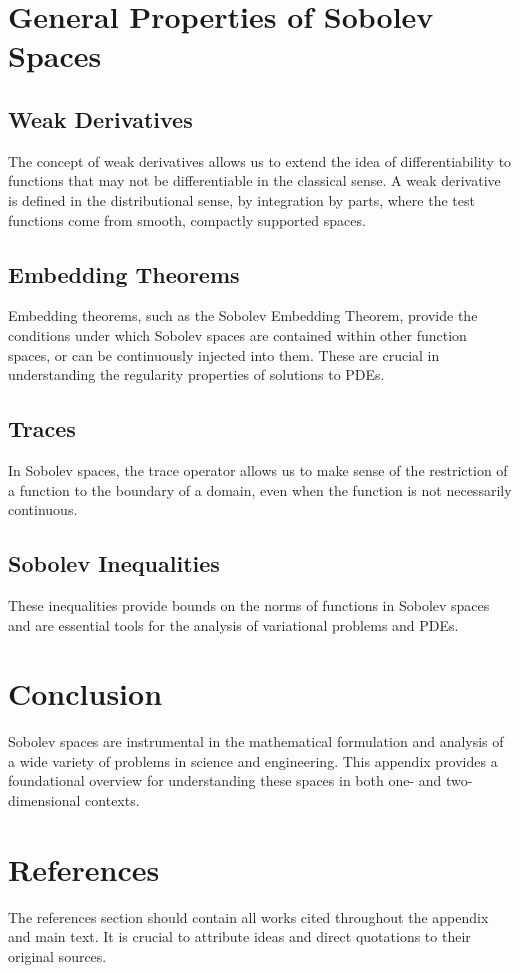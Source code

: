 \documentclass[../../main.tex]{subfiles}
\begin{document}
\section*{General Properties of Sobolev Spaces}
\subsection*{Weak Derivatives}
The concept of weak derivatives allows us to extend the idea of differentiability to functions that may not be differentiable in the classical sense. A weak derivative is defined in the distributional sense, by integration by parts, where the test functions come from smooth, compactly supported spaces.

\subsection*{Embedding Theorems}
Embedding theorems, such as the Sobolev Embedding Theorem, provide the conditions under which Sobolev spaces are contained within other function spaces, or can be continuously injected into them. These are crucial in understanding the regularity properties of solutions to PDEs.

\subsection*{Traces}
In Sobolev spaces, the trace operator allows us to make sense of the restriction of a function to the boundary of a domain, even when the function is not necessarily continuous.

\subsection*{Sobolev Inequalities}
These inequalities provide bounds on the norms of functions in Sobolev spaces and are essential tools for the analysis of variational problems and PDEs.

\section*{Conclusion}
Sobolev spaces are instrumental in the mathematical formulation and analysis of a wide variety of problems in science and engineering. This appendix provides a foundational overview for understanding these spaces in both one- and two-dimensional contexts.

\section*{References}
The references section should contain all works cited throughout the appendix and main text. It is crucial to attribute ideas and direct quotations to their original sources.
\end{document}
